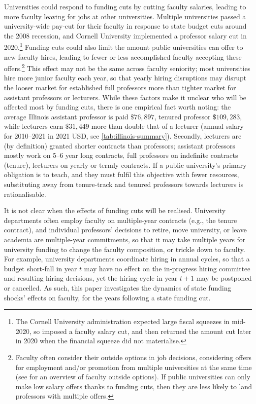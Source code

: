 Universities could respond to funding cuts by cutting faculty salaries, leading to more faculty leaving for jobs at other universities.
Multiple universities passed a university-wide pay-cut for their faculty in response to state budget cuts around the 2008 recession, and Cornell University implemented a professor salary cut in 2020.\footnote{
    The Cornell University administration expected large fiscal squeezes in mid-2020, so imposed a faculty salary cut, and then returned the amount cut later in 2020 when the financial squeeze did not materialise.}
Funding cuts could also limit the amount public universities can offer to new faculty hires, leading to fewer or less accomplished faculty accepting these offers.\footnote{
    Faculty often consider their outside options in job decisions, considering offers for employment and/or promotion from multiple universities at the same time (see \citealt{blackaby2005} for an overview of faculty outside options).
    If public universities can only make low salary offers thanks to funding cuts, then they are less likely to land professors with multiple offers.
}
This effect may not be the same across faculty seniority; most universities hire more junior faculty each year, so that yearly hiring disruptions may disrupt the looser market for established full professors more than tighter market for assistant professors or lecturers.
While these factors make it unclear who will be affected most by funding cuts, there is one empirical fact worth noting: the average Illinois assistant professor is paid $\$76,897$, tenured professor $\$109,283$, while lecturers earn $\$31,449$ more than double that of a lecturer (annual salary for 2010--2021 in 2021 USD, see \autoref{tab:illinois-summary}).
Secondly, lecturers are (by definition) granted shorter contracts than professors; assistant professors mostly work on 5--6 year long contracts, full professors on indefinite contracts (tenure), lecturers on yearly or termly contracts.
If a public university's primary obligation is to teach, and they must fulfil this objective with fewer resources, substituting away from tenure-track and tenured professors towards lecturers is rationalisable.

It is not clear when the effects of funding cuts will be realised.
University departments often employ faculty on multiple-year contracts (e.g., the tenure contract), and individual professors' decisions to retire, move university, or leave academia are multiple-year commitments, so that it may take multiple years for university funding to change the faculty composition, or trickle down to faculty.
For example, university departments coordinate hiring in annual cycles, so that a budget short-fall in year $t$ may have no effect on the in-progress hiring committee and resulting hiring decisions, yet the hiring cycle in year $t+1$ may be postponed or cancelled.
As such, this paper investigates the dynamics of state funding shocks' effects on faculty, for the years following a state funding cut.
